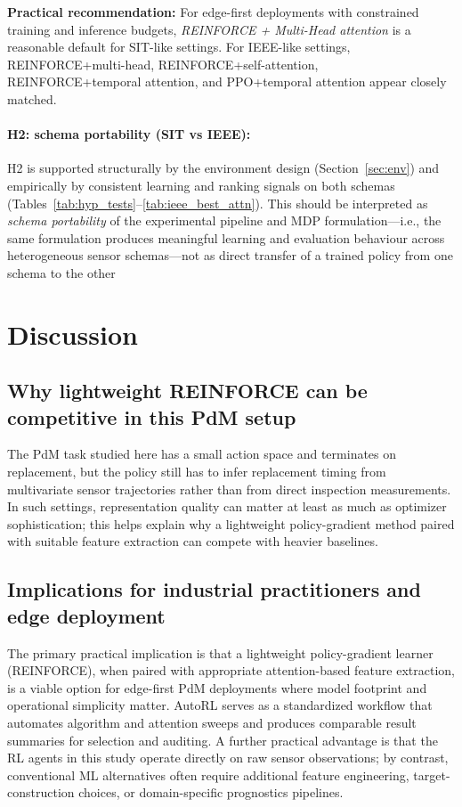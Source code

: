 \documentclass[sn-basic]{sn-jnl} %
\begin{document}
\textbf{Practical recommendation:}
For edge-first deployments with constrained training and inference budgets, \emph{REINFORCE + Multi-Head attention} is a reasonable default for SIT-like settings. For IEEE-like settings, \textsc{REINFORCE}+multi-head, \textsc{REINFORCE}+self-attention, \textsc{REINFORCE}+temporal attention, and PPO+temporal attention appear closely matched.

\paragraph{H2: schema portability (SIT vs IEEE):}
H2 is supported structurally by the environment design (Section~\ref{sec:env}) and empirically by consistent learning and ranking signals on both schemas (Tables~\ref{tab:hyp_tests}--\ref{tab:ieee_best_attn}). This should be interpreted as \emph{schema portability} of the experimental pipeline and MDP formulation---i.e., the same formulation produces meaningful learning and evaluation behaviour across heterogeneous sensor schemas---not as direct transfer of a trained policy from one schema to the other

\section{Discussion}
\label{sec:discussion}
\subsection{Why lightweight REINFORCE can be competitive in this PdM setup}
The PdM task studied here has a small action space and terminates on replacement, but the policy still has to infer replacement timing from multivariate sensor trajectories rather than from direct inspection measurements. In such settings, representation quality can matter at least as much as optimizer sophistication; this helps explain why a lightweight policy-gradient method paired with suitable feature extraction can compete with heavier baselines.

\subsection{Implications for industrial practitioners and edge deployment}
The primary practical implication is that a lightweight policy-gradient learner (\textsc{REINFORCE}), when paired with appropriate attention-based feature extraction, is a viable option for edge-first PdM deployments where model footprint and operational simplicity matter. AutoRL serves as a standardized workflow that automates algorithm and attention sweeps and produces comparable result summaries for selection and auditing. A further practical advantage is that the RL agents in this study operate directly on raw sensor observations; by contrast, conventional ML alternatives often require additional feature engineering, target-construction choices, or domain-specific prognostics pipelines.
\end{document}

